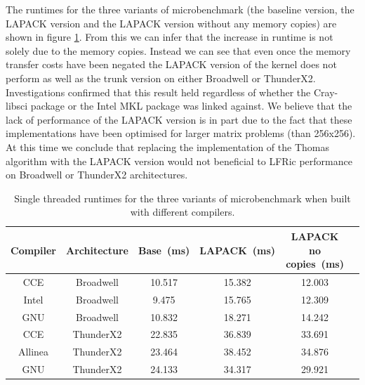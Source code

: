 The runtimes for the three variants of microbenchmark (the baseline version, the LAPACK version and the LAPACK version without any memory copies) are shown in figure \ref{tab:lapack_table}.
From this we can infer that the increase in runtime is not solely due to the memory copies.
Instead we can see that even once the memory transfer costs have been negated the LAPACK version of the kernel does not perform as well as the trunk version on either Broadwell or ThunderX2.
Investigations confirmed that this result held regardless of whether the Cray-libsci package or the Intel MKL package was linked against.
We believe that the lack of performance of the LAPACK version is in part due to the fact that these implementations have been optimised for larger matrix problems (than 256x256).
At this time we conclude that replacing the implementation of the Thomas algorithm with the LAPACK version would not beneficial to LFRic performance on Broadwell or ThunderX2 architectures.

\begin{table}[t]
  \scriptsize
  \begin{center}
    \caption{Single threaded runtimes for the three variants of microbenchmark when built with different compilers.}
    \label{tab:lapack_table}
     \begin{tabular}{|c|c|c|c|c|c|}
      \textbf{Compiler} & \textbf{Architecture} & \textbf{Base~(ms)} & \textbf{LAPACK~(ms)} & \textbf{LAPACK no copies~(ms)} \\
      \hline
      CCE & Broadwell & 10.517 & 15.382 & 12.003 \\
      Intel & Broadwell & 9.475 & 15.765 & 12.309 \\
      GNU & Broadwell & 10.832 & 18.271 & 14.242 \\
      CCE & ThunderX2 & 22.835 & 36.839 & 33.691 \\
      Allinea & ThunderX2 & 23.464 & 38.452 & 34.876 \\
      GNU & ThunderX2 & 24.133 & 34.317 & 29.921 \\
    \end{tabular}
  \end{center}
\end{table}
